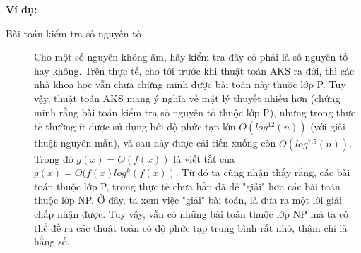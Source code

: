 \documentclass[a4paper 14pt]{article}
\begin{document}
			\textbf{Ví dụ:}
			\begin{description}
				\item[Bài toán kiểm tra số nguyên tố] Cho một số nguyên không âm, hãy kiểm tra đây có phải là số nguyên tố hay không. Trên thực tế, cho tới trước khi thuật toán AKS ra đời, thì các nhà khoa học vẫn chưa chứng minh được bài toán này thuộc lớp P. Tuy vậy, thuật toán AKS mang ý nghĩa về mặt lý thuyết nhiều hơn (chứng minh rằng bài toán kiểm tra số nguyên tố thuộc lớp P), nhưng trong thực tế thường ít được sử dụng bởi độ phức tạp lớn $\overset{~}{O(log^{12}(n))}$ (với giải thuật nguyên mẫu), và sau này được cải tiến xuống còn $\overset{~}{O(log^{7.5}(n))}$. Trong đó $g(x) = \overset{~}{O(f(x))}$ là viết tắt của $g(x) = O(f(x)log^k(f(x))$. Từ đó ta cũng nhận thấy rằng, các bài toán thuộc lớp P, trong thực tế chưa hẳn đã dễ "giải" hơn các bài toán thuộc lớp NP. Ở đây, ta xem việc "giải" bài toán, là đưa ra một lời giải chấp nhận được. Tuy vậy, vẫn có những bài toán thuộc lớp NP mà ta có thể đề ra các thuật toán có độ phức tạp trung bình rất nhỏ, thậm chí là hằng số.
			\end{description}
\end{document}
